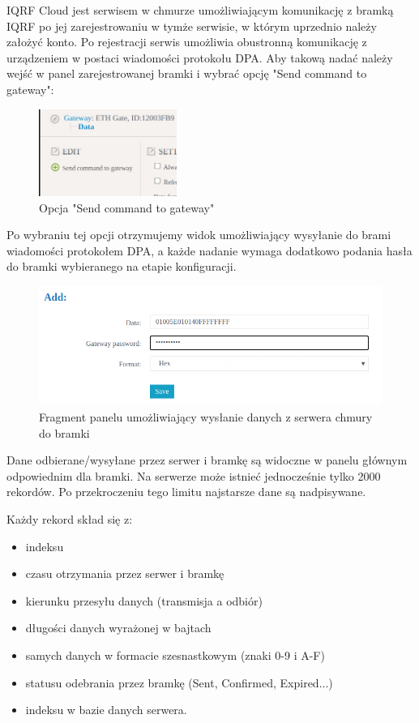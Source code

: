 IQRF Cloud jest serwisem w chmurze umożliwiającym komunikację z bramką IQRF po jej zarejestrowaniu w tymże serwisie, w którym uprzednio należy
założyć konto. Po rejestracji serwis umożliwia obustronną komunikację z urządzeniem w postaci wiadomości protokołu DPA. Aby takową nadać należy 
wejść w panel zarejestrowanej bramki i wybrać opcję "Send command to gateway":

\begin{figure}[H]
    \centering
    \includegraphics[width=0.4\textwidth]{zdj/send-command-to-gw.png}
    \caption{Opcja "Send command to gateway"}
\end{figure}

Po wybraniu tej opcji otrzymujemy widok umożliwiający wysyłanie do brami wiadomości protokołem DPA, a każde nadanie wymaga dodatkowo podania
hasła do bramki wybieranego na etapie konfiguracji.

\begin{figure}[H]
    \includegraphics[width=\textwidth]{zdj/cloud-send-message.png}
    \caption{Fragment panelu umożliwiający wysłanie danych z serwera chmury do bramki}
\end{figure}

Dane odbierane/wysyłane przez serwer i bramkę są widoczne w panelu głównym odpowiednim dla bramki. Na serwerze może istnieć jednocześnie tylko 2000
rekordów. Po przekroczeniu tego limitu najstarsze dane są nadpisywane.

Każdy rekord skład się z:
\begin{itemize}
    \item indeksu 
    \item czasu otrzymania przez serwer i bramkę
    \item kierunku przesyłu danych (transmisja a odbiór)
    \item długości danych wyrażonej w bajtach 
    \item samych danych w formacie szesnastkowym (znaki 0-9 i A-F)
    \item statusu odebrania przez bramkę (Sent, Confirmed, Expired...)
    \item indeksu w bazie danych serwera.
\end{itemize}

